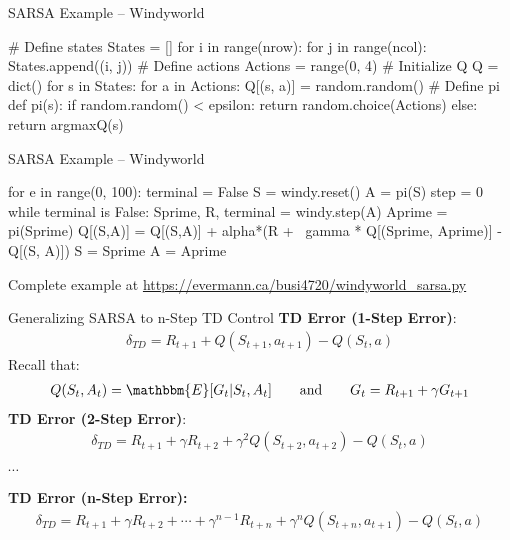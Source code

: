 \documentclass[ignorenonframetext,xcolor=x11names]{beamer}
\begin{document}
\begin{frame}[fragile]{SARSA Example -- Windyworld}
\begin{pythoncode}
# Define states
States = []
for i in range(nrow):
    for j in range(ncol):
        States.append((i, j))
# Define actions
Actions = range(0, 4)
# Initialize Q
Q = dict()
for s in States:
    for a in Actions:
        Q[(s, a)] = random.random()
# Define pi
def pi(s):
    if random.random() < epsilon:
        return random.choice(Actions)
    else:
        return argmaxQ(s)
\end{pythoncode}
\end{frame}


\begin{frame}[fragile]{SARSA Example -- Windyworld}
\begin{pythoncode}
for e in range(0, 100):
    terminal = False
    S = windy.reset()
    A = pi(S)
    step = 0
    while terminal is False:
        Sprime, R, terminal = windy.step(A)
        Aprime = pi(Sprime)
        Q[(S,A)] = Q[(S,A)] + alpha*(R + \
            gamma * Q[(Sprime, Aprime)] - Q[(S, A)])
        S = Sprime
        A = Aprime
\end{pythoncode}

Complete example at \url{https://evermann.ca/busi4720/windyworld_sarsa.py}

\end{frame}

\begin{frame}{Generalizing SARSA to n-Step TD Control}
\textbf{TD Error (1-Step Error)}:
\begin{align*}
\delta_{TD} = R_{t+1} + Q(S_{t+1}, a_{t+1}) - Q(S_t, a)
\end{align*}
Recall that:
\begin{align*}
Q(S_t, A_t) = \mathbbm{E}[G_t | S_t, A_t] \qquad \text{and} \qquad G_t = R_{t+1} + \gamma G_{t+1}
\end{align*}
\textbf{TD Error (2-Step Error)}:
\begin{align*}
\delta_{TD} = R_{t+1} + \gamma R_{t+2} + \gamma^2 Q(S_{t+2}, a_{t+2}) - Q(S_t, a)
\end{align*}
\begin{center}\vspace{-2\baselineskip}$\cdots$\end{center}
\textbf{TD Error (n-Step Error):}
\begin{align*}
\delta_{TD} = R_{t+1} + \gamma R_{t+2} + \cdots + \gamma^{n-1} R_{t+n} + \gamma^n Q(S_{t+n}, a_{t+1}) - Q(S_t, a)
\end{align*}
\end{frame}
\end{document}
